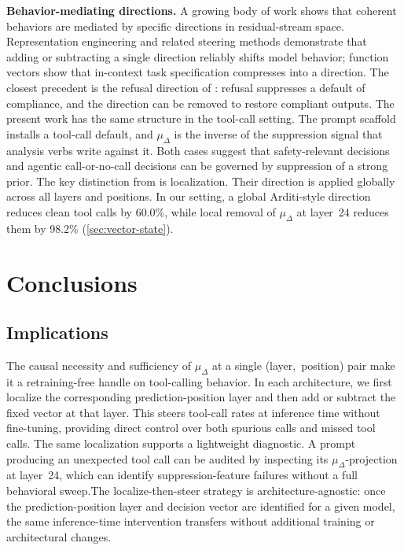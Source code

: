 \documentclass{article}
\begin{document}
\textbf{Behavior-mediating directions.}
A growing body of work shows that coherent behaviors are mediated by
specific directions in residual-stream space.
Representation engineering \citep{zou2023repe} and related steering
methods \citep{li2023iti, turner2023activation, panickssery2023caa}
demonstrate that adding or subtracting a single direction reliably
shifts model behavior; function vectors \citep{todd2024functionvectors}
show that in-context task specification compresses into a direction.
The closest precedent is the refusal direction of
\citet{arditi2024refusal}: refusal suppresses a default of compliance,
and the direction can be removed to restore compliant outputs.
The present work has the same structure in the tool-call setting. The
prompt scaffold installs a tool-call default, and $\mu_\Delta$ is the
inverse of the suppression signal that analysis verbs write against it.
Both cases suggest that safety-relevant decisions and agentic
call-or-no-call decisions can be governed by suppression of a strong
prior.
The key distinction from \citet{arditi2024refusal} is localization.
Their direction is applied globally across all layers and positions. In
our setting, a global Arditi-style direction reduces clean tool calls by
60.0\%, while local removal of $\mu_\Delta$ at layer~24 reduces them by
98.2\% (\autoref{sec:vector-state}).

\section{Conclusions}
\label{sec:discussion}

\subsection{Implications}

The causal necessity and sufficiency of $\mu_\Delta$ at a single
(layer,~position) pair make it a retraining-free handle on tool-calling
behavior. In each architecture, we first localize the corresponding
prediction-position layer and then add or subtract the fixed vector at
that layer. This steers tool-call rates at inference time without
fine-tuning, providing direct control over both spurious calls and missed
tool calls.
The same localization supports a lightweight diagnostic. A prompt
producing an unexpected tool call can be audited by inspecting its
$\mu_\Delta$-projection at layer~24, which can identify
suppression-feature failures without a full behavioral sweep.The localize-then-steer strategy is architecture-agnostic: once the prediction-position layer and decision vector are identified for a given model, the same inference-time intervention transfers without additional training or architectural changes.
\end{document}
